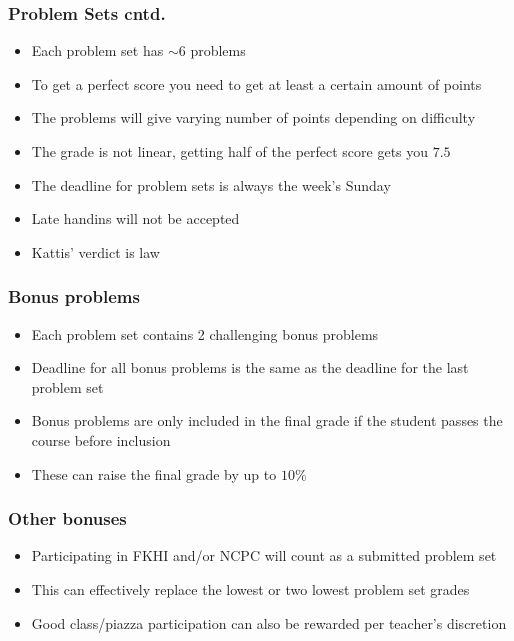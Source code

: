 \documentclass{beamer}
\begin{document}
\begin{frame}[plain]
	\frametitle{Problem Sets cntd.}
	\begin{itemize}
	    \item Each problem set has $\sim 6$ problems
        \item To get a perfect score you need to get at least a certain amount of points
        \item The problems will give varying number of points depending on difficulty
        \item The grade is not linear, getting half of the perfect score gets you $7.5$
        \item The deadline for problem sets is always the week's Sunday
        \item Late handins will not be accepted
        \item Kattis' verdict is law
	\end{itemize}
\end{frame}

\begin{frame}[plain]
	\frametitle{Bonus problems}
	\begin{itemize}
	    \item Each problem set contains 2 challenging bonus problems
        \item Deadline for all bonus problems is the same as the deadline for the last problem set
        \item Bonus problems are only included in the final grade if the student passes the course before inclusion
        \item These can raise the final grade by up to $10\%$
	\end{itemize}
\end{frame}

\begin{frame}[plain]
	\frametitle{Other bonuses}
	\begin{itemize}
	    \item Participating in FKHI and/or NCPC will count as a submitted problem set
	    \item This can effectively replace the lowest or two lowest problem set grades
	    \item Good class/piazza participation can also be rewarded per teacher's discretion
	\end{itemize}
\end{frame}
\end{document}
